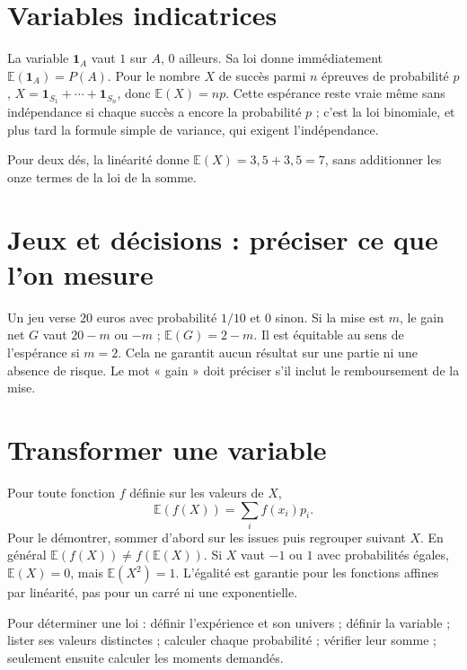 \documentclass[../cours_1re.tex]{subfiles}
\begin{document}
\section{Variables indicatrices}
La variable $\mathbf1_A$ vaut $1$ sur $A$, $0$ ailleurs.
Sa loi donne immédiatement $\mathbb E(\mathbf1_A)=P(A)$.
Pour le nombre $X$ de succès parmi $n$ épreuves de probabilité $p$,
$X=\mathbf1_{S_1}+\cdots+\mathbf1_{S_n}$, donc
$\mathbb E(X)=np$. Cette espérance reste vraie même sans indépendance
si chaque succès a encore la probabilité $p$ ; c'est la loi binomiale,
et plus tard la formule simple de variance, qui exigent l'indépendance.
\begin{exemple}
Pour deux dés, la linéarité donne $\mathbb E(X)=3{,}5+3{,}5=7$,
sans additionner les onze termes de la loi de la somme.
\end{exemple}

\section{Jeux et décisions : préciser ce que l'on mesure}
Un jeu verse $20$ euros avec probabilité $1/10$ et $0$ sinon.
Si la mise est $m$, le gain net $G$ vaut $20-m$ ou $-m$ ;
$\mathbb E(G)=2-m$. Il est équitable au sens de l'espérance si $m=2$.
Cela ne garantit aucun résultat sur une partie ni une absence de risque.
Le mot « gain » doit préciser s'il inclut le remboursement de la mise.

\section{Transformer une variable}
Pour toute fonction $f$ définie sur les valeurs de $X$,
\[
\mathbb E(f(X))=\sum_i f(x_i)p_i.
\]
Pour le démontrer, sommer d'abord sur les issues puis regrouper suivant $X$.
En général $\mathbb E(f(X))\ne f(\mathbb E(X))$.
Si $X$ vaut $-1$ ou $1$ avec probabilités égales,
$\mathbb E(X)=0$, mais $\mathbb E(X^2)=1$.
L'égalité est garantie pour les fonctions affines par linéarité,
pas pour un carré ni une exponentielle.

\begin{methode}
Pour déterminer une loi : définir l'expérience et son univers ; définir la
variable ; lister ses valeurs distinctes ; calculer chaque probabilité ;
vérifier leur somme ; seulement ensuite calculer les moments demandés.
\end{methode}
\end{document}
